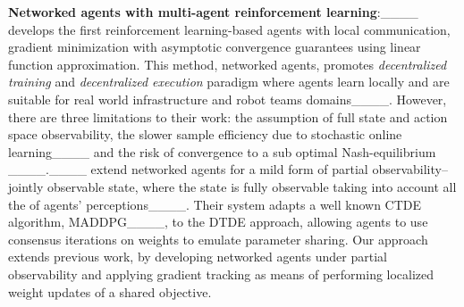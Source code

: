 \textbf{Networked agents with multi-agent reinforcement learning}:____  develops the first reinforcement learning-based agents with local communication, gradient minimization with asymptotic convergence guarantees using linear function approximation. This method, networked agents, promotes {\em decentralized training} and {\em decentralized execution} paradigm where agents learn locally and are suitable for real world infrastructure and robot teams domains____. However, there are three limitations to their work: the assumption of full state and action space observability, the slower sample efficiency due to stochastic online learning____ and the risk of convergence to a sub optimal Nash-equilibrium ____.____ extend networked agents for a mild form of partial observability--jointly observable state, where the state is fully observable taking into account all the of agents' perceptions____. Their system adapts a well known CTDE algorithm, MADDPG____, to the DTDE approach, allowing agents to use consensus iterations on weights to emulate parameter sharing. Our approach extends previous work, by  developing networked agents under partial observability and applying gradient tracking  as means of performing localized weight updates of a shared objective.